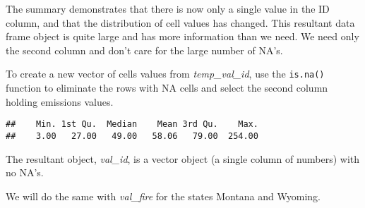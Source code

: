 \documentclass[
]{article}
\newenvironment{Shaded}{\begin{snugshade}}{\end{snugshade}}
\newcommand{\AttributeTok}[1]{\textcolor[rgb]{0.13,0.29,0.53}{#1}}
\newcommand{\CommentTok}[1]{\textcolor[rgb]{0.56,0.35,0.01}{\textit{#1}}}
\newcommand{\DecValTok}[1]{\textcolor[rgb]{0.00,0.00,0.81}{#1}}
\newcommand{\FunctionTok}[1]{\textcolor[rgb]{0.13,0.29,0.53}{\textbf{#1}}}
\newcommand{\NormalTok}[1]{#1}
\newcommand{\OtherTok}[1]{\textcolor[rgb]{0.56,0.35,0.01}{#1}}
\newcommand{\SpecialCharTok}[1]{\textcolor[rgb]{0.81,0.36,0.00}{\textbf{#1}}}
\begin{document}
The summary demonstrates that there is now only a single value in the ID
column, and that the distribution of cell values has changed. This
resultant data frame object is quite large and has more information than
we need. We need only the second column and don't care for the large
number of NA's.

To create a new vector of cells values from \emph{temp\_val\_id}, use
the \texttt{is.na()} function to eliminate the rows with NA cells and
select the second column holding emissions values.

\begin{Shaded}
\end{Shaded}

\begin{verbatim}
##    Min. 1st Qu.  Median    Mean 3rd Qu.    Max. 
##    3.00   27.00   49.00   58.06   79.00  254.00
\end{verbatim}

The resultant object, \emph{val\_id}, is a vector object (a single
column of numbers) with no NA's.

We will do the same with \emph{val\_fire} for the states Montana and
Wyoming.

\begin{Shaded}
\end{Shaded}
\end{document}
